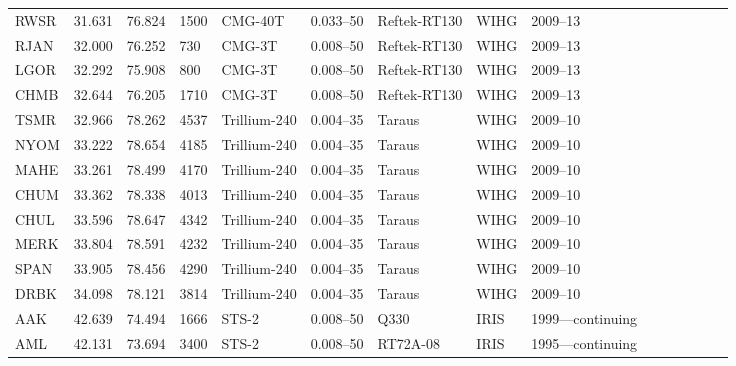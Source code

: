 \begin{table}[]
{\begin{tabular}{lp{1cm}lp{2cm}lp{2cm}lp{2cm}llp{2cm}lp{2cm}ll}
RWSR & 31.631        & 76.824         & 1500          & CMG-40T      & 0.033–50          & Reftek-RT130     & WIHG    & 2009–13                     \\
RJAN & 32.000        & 76.252         & 730           & CMG-3T       & 0.008–50          & Reftek-RT130     & WIHG    & 2009–13                     \\
LGOR & 32.292        & 75.908         & 800           & CMG-3T       & 0.008–50          & Reftek-RT130     & WIHG    & 2009–13                     \\
CHMB & 32.644        & 76.205         & 1710          & CMG-3T       & 0.008–50          & Reftek-RT130     & WIHG    & 2009–13                     \\
TSMR & 32.966        & 78.262         & 4537          & Trillium-240 & 0.004–35          & Taraus           & WIHG    & 2009–10                     \\
NYOM & 33.222        & 78.654         & 4185          & Trillium-240 & 0.004–35          & Taraus           & WIHG    & 2009–10                     \\
MAHE & 33.261        & 78.499         & 4170          & Trillium-240 & 0.004–35          & Taraus           & WIHG    & 2009–10                     \\
CHUM & 33.362        & 78.338         & 4013          & Trillium-240 & 0.004–35          & Taraus           & WIHG    & 2009–10                     \\
CHUL & 33.596        & 78.647         & 4342          & Trillium-240 & 0.004–35          & Taraus           & WIHG    & 2009–10                     \\
MERK & 33.804        & 78.591         & 4232          & Trillium-240 & 0.004–35          & Taraus           & WIHG    & 2009–10                     \\
SPAN & 33.905        & 78.456         & 4290          & Trillium-240 & 0.004–35          & Taraus           & WIHG    & 2009–10                     \\
DRBK & 34.098        & 78.121         & 3814          & Trillium-240 & 0.004–35          & Taraus           & WIHG    & 2009–10                     \\
AAK  & 42.639        & 74.494         & 1666          & STS-2        & 0.008–50          & Q330             & IRIS    & 1999—continuing             \\
AML  & 42.131        & 73.694         & 3400          & STS-2        & 0.008–50          & RT72A-08         & IRIS    & 1995—continuing             \\

\end{tabular}}
\end{table}
